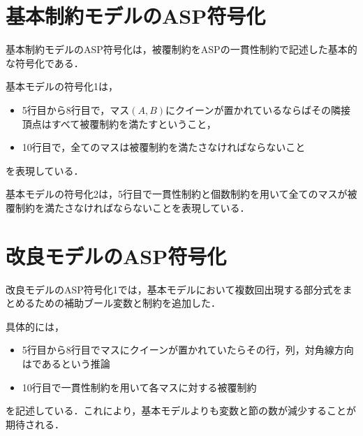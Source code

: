 \section{基本制約モデルのASP符号化}
基本制約モデルのASP符号化は，被覆制約をASPの一貫性制約で記述した基本的な符号化である．



基本モデルの符号化1は，
\begin{itemize}
 \item 5行目から8行目で，マス$(A,B)$にクイーンが置かれているならばその隣接頂点はすべて被覆制約を満たすということ，
 \item 10行目で，全てのマスは被覆制約を満たさなければならないこと
\end{itemize}
を表現している．

\newpage



基本モデルの符号化2は，5行目で一貫性制約と個数制約を用いて全てのマスが被覆制約を満たさなければならないことを表現している．
\newpage
\section{改良モデルのASP符号化}


改良モデルのASP符号化1では，基本モデルにおいて複数回出現する部分式をまとめるための補助ブール変数と制約を追加した．\par
具体的には，\begin{itemize}
	     \item 5行目から8行目でマスにクイーンが置かれていたらその行，列，対角線方向はであるという推論
	     \item 10行目で一貫性制約を用いて各マスに対する被覆制約
	    \end{itemize}
を記述している．これにより，基本モデルよりも変数と節の数が減少することが期待される．

